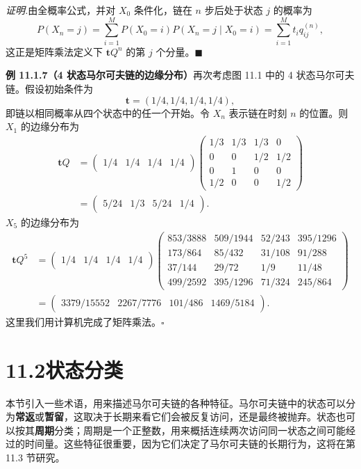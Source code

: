 \documentclass[UTF8,12pt,a4paper,fontset=fandol]{ctexart}
\begin{document}
\noindent\textit{证明.}\quad 由全概率公式，并对 $X_0$ 条件化，链在 $n$ 步后处于状态 $j$ 的概率为
\[
  P(X_n=j)
  =
  \sum_{i=1}^M P(X_0=i)P(X_n=j\mid X_0=i)
  =
  \sum_{i=1}^M t_i q_{ij}^{(n)},
\]
这正是矩阵乘法定义下 $\mathbf tQ^n$ 的第 $j$ 个分量。$\blacksquare$

\noindent\textbf{例 11.1.7（4 状态马尔可夫链的边缘分布）}\quad 再次考虑图 11.1 中的 4 状态马尔可夫链。假设初始条件为
\[
  \mathbf t=(1/4,1/4,1/4,1/4),
\]
即链以相同概率从四个状态中的任一个开始。令 $X_n$ 表示链在时刻 $n$ 的位置。则 $X_1$ 的边缘分布为
\[
\begin{aligned}
  \mathbf tQ
  &=
  \begin{pmatrix}1/4&1/4&1/4&1/4\end{pmatrix}
  \begin{pmatrix}
    1/3 & 1/3 & 1/3 & 0\\
    0 & 0 & 1/2 & 1/2\\
    0 & 1 & 0 & 0\\
    1/2 & 0 & 0 & 1/2
  \end{pmatrix}\\
  &=
  \begin{pmatrix}5/24&1/3&5/24&1/4\end{pmatrix}.
\end{aligned}
\]
$X_5$ 的边缘分布为
\[
\begin{aligned}
  \mathbf tQ^5
  &=
  \begin{pmatrix}1/4&1/4&1/4&1/4\end{pmatrix}
  \begin{pmatrix}
    853/3888 & 509/1944 & 52/243 & 395/1296\\
    173/864 & 85/432 & 31/108 & 91/288\\
    37/144 & 29/72 & 1/9 & 11/48\\
    499/2592 & 395/1296 & 71/324 & 245/864
  \end{pmatrix}\\
  &=
  \begin{pmatrix}3379/15552&2267/7776&101/486&1469/5184\end{pmatrix}.
\end{aligned}
\]
这里我们用计算机完成了矩阵乘法。$\square$

\section*{11.2\quad 状态分类}

本节引入一些术语，用来描述马尔可夫链的各种特征。马尔可夫链中的状态可以分为\textbf{常返}或\textbf{暂留}，这取决于长期来看它们会被反复访问，还是最终被抛弃。状态也可以按其\textbf{周期}分类；周期是一个正整数，用来概括连续两次访问同一状态之间可能经过的时间量。这些特征很重要，因为它们决定了马尔可夫链的长期行为，这将在第 11.3 节研究。
\end{document}
